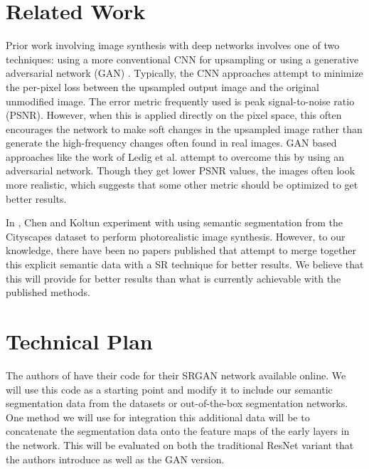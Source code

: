 \documentclass[10pt,twocolumn,letterpaper]{article}
\begin{document}
\section{Related Work}
Prior work involving image synthesis with deep networks involves one of two
techniques: using a more conventional CNN for upsampling
\cite{PerceptualLosses} \cite{RealtimeCNN} \cite{DeeplyRecursive} or using a
generative adversarial network (GAN) \cite{GAN}. Typically, the CNN approaches
attempt to minimize the per-pixel loss between the upsampled output image and
the original unmodified image. The error metric frequently used is peak
signal-to-noise ratio (PSNR). However, when this is applied directly on the
pixel space, this often encourages the network to make soft changes in the
upsampled image rather than generate the high-frequency changes often found in
real images. GAN based approaches like the work of Ledig et al. \cite{SRGAN}
attempt to overcome this by using an adversarial network. Though they get lower
PSNR values, the images often look more realistic, which suggests that some
other metric should be optimized to get better results.

In \cite{ImageSynthesis}, Chen and Koltun experiment with using semantic
segmentation from the Cityscapes dataset \cite{Cityscapes} to perform
photorealistic image synthesis. However, to our knowledge, there have been no
papers published that attempt to merge together this explicit semantic data
with a SR technique for better results. We believe that this will provide for
better results than what is currently achievable with the published methods.


\section{Technical Plan}
The authors of \cite{SRGAN} have their code for their SRGAN network available
online. We will use this code as a starting point and modify it to include our
semantic segmentation data from the datasets or out-of-the-box segmentation
networks. One method we will use for integration this additional data will be
to concatenate the segmentation data onto the feature maps of the early layers
in the network. This will be evaluated on both the traditional ResNet variant
that the authors introduce as well as the GAN version.  

\end{document}
